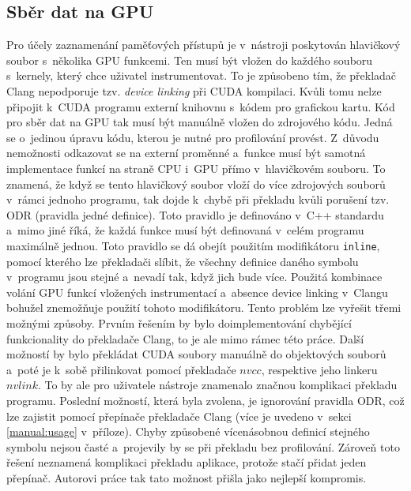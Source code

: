 \subsection{Sběr dat na GPU}
\label{sec:gpucollection}
Pro účely zaznamenání paměťových přístupů je v~nástroji poskytován hlavičkový soubor s~několika GPU funkcemi. Ten musí být vložen do každého souboru s~kernely, který chce uživatel instrumentovat. To je způsobeno tím, že překladač Clang nepodporuje tzv. \emph{device linking} při CUDA kompilaci. Kvůli tomu nelze připojit k~CUDA programu externí knihovnu s~kódem pro grafickou kartu. Kód pro sběr dat na GPU tak musí být manuálně vložen do zdrojového kódu. Jedná se o~jedinou úpravu kódu, kterou je nutné pro profilování provést.
Z~důvodu nemožnosti odkazovat se na externí proměnné a~funkce musí být samotná implementace funkcí na straně CPU i~GPU přímo v~hlavičkovém souboru. To znamená, že když se tento hlavičkový soubor vloží do více zdrojových souborů v~rámci jednoho programu, tak dojde k~chybě při překladu kvůli porušení tzv. ODR (pravidla jedné definice). Toto pravidlo je definováno v~C++ standardu \cite{cppiso} a~mimo jiné říká, že každá funkce musí být definovaná v~celém programu maximálně jednou. Toto pravidlo se dá obejít použitím modifikátoru \texttt{inline}, pomocí kterého lze překladači slíbit, že všechny definice daného symbolu v~programu jsou stejné a~nevadí tak, když jich bude více. Použitá kombinace volání GPU funkcí vložených instrumentací a~absence device linking v~Clangu bohužel znemožňuje použití tohoto modifikátoru. 
Tento problém lze vyřešit třemi možnými způsoby. Prvním řešením by bylo doimplementování chybějící funkcionality do překladače Clang, to je ale mimo rámec této práce. Další možností by bylo překládat CUDA soubory manuálně do objektových souborů a~poté je k~sobě přilinkovat pomocí překladače $nvcc$, respektive jeho linkeru $nvlink$. To by ale pro uživatele nástroje znamenalo značnou komplikaci překladu programu. Poslední možností, která byla zvolena, je ignorování pravidla ODR, což lze zajistit pomocí přepínače překladače Clang (více je uvedeno v~sekci \ref{manual:usage} v~příloze). Chyby způsobené vícenásobnou definicí stejného symbolu nejsou časté a~projevily by se při překladu bez profilování. Zároveň toto řešení neznamená komplikaci překladu aplikace, protože stačí přidat jeden přepínač. Autorovi práce tak tato možnost přišla jako nejlepší kompromis.

